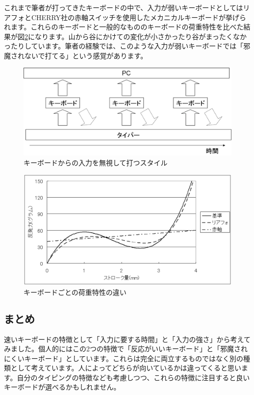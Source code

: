 これまで筆者が打ってきたキーボードの中で、入力が弱いキーボードとしてはリアフォとCHERRY社の赤軸スイッチを使用したメカニカルキーボードが挙げられます。これらのキーボードと一般的なもののキーボードの荷重特性を比べた結果が図\ref{eigh:img7}になります。山から谷にかけての変化が小さかったり谷がまったくなかったりしています。筆者の経験では、このような入力が弱いキーボードでは「邪魔されないで打てる」という感覚があります。

\begin{figure}
 \begin{center}
   \includegraphics[width=14cm,clip]{res_eigh/img6.eps}
 \end{center}
 \caption{キーボードからの入力を無視して打つスタイル}
 \label{eigh:img6}
\end{figure}

\begin{figure}
 \begin{center}
   \includegraphics[width=14cm,clip]{res_eigh/img7.eps}
 \end{center}
 \caption{キーボードごとの荷重特性の違い}
 \label{eigh:img7}
\end{figure}

\subsection{まとめ}
速いキーボードの特徴として「入力に要する時間」と「入力の強さ」から考えてみました。個人的にはこの2つの特徴で「反応がいいキーボード」と「邪魔されにくいキーボード」としています。これらは完全に両立するものではなく別の種類として考えています。人によってどちらが向いているかは違ってくると思います。自分のタイピングの特徴なども考慮しつつ、これらの特徴に注目すると良いキーボードが選べるかもしれません。

